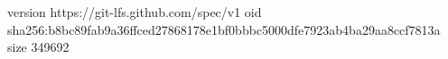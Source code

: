 version https://git-lfs.github.com/spec/v1
oid sha256:b8bc89fab9a36ffced27868178e1bf0bbbc5000dfe7923ab4ba29aa8ccf7813a
size 349692
